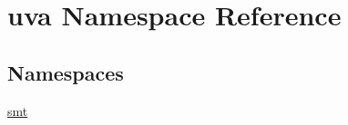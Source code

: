 \hypertarget{namespaceuva}{}\section{uva Namespace Reference}
\label{namespaceuva}
\subsection*{Namespaces}
\begin{DoxyCompactItemize}
\item 
 \hyperlink{namespaceuva_1_1smt}{smt}
\end{DoxyCompactItemize}
